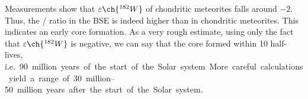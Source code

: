 \documentclass[10pt]{article}
\begin{document}
        Measurements show that $\varepsilon\ch{^{182}W}$ of chondritic meteorites falls around $-2$. Thus, the / ratio
        in the BSE is indeed higher than in chondritic meteorites. This indicates an early core formation. As a very rough estimate,
        using only the fact that $\varepsilon\ch{^{182}W}$ is negative, we can say that the core formed within 10 half-lives, i.e.\ 
        \SI{90} million years of the start of the Solar system. More careful calculations yield a range of \SIrange{30}{50}{million} years
        after the start of the Solar system.
\end{document}
